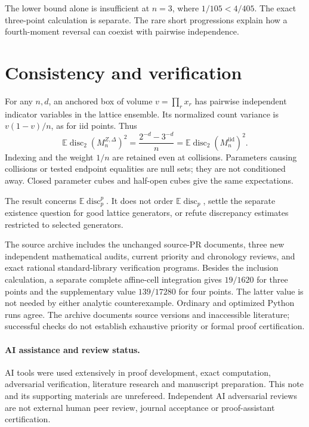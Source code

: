 \documentclass[11pt]{article}
\newcommand{\E}{\mathbb E}
\newcommand{\disc}{\operatorname{disc}}
\newcommand{\iid}{\mathrm{iid}}
\begin{document}
The lower bound alone is insufficient at $n=3$, where
$1/105<4/405$. The exact three-point calculation is separate.
The rare short progressions explain how a fourth-moment reversal can
coexist with pairwise independence.

\section{Consistency and verification}
For any $n,d$, an anchored box of volume $v=\prod_r x_r$ has pairwise
independent indicator variables in the lattice ensemble. Its normalized
count variance is $v(1-v)/n$, as for iid points. Thus
\[
 \E\disc_2(M_n^{Z,\Delta})^2
 =\frac{2^{-d}-3^{-d}}{n}
 =\E\disc_2(M_n^\iid)^2.
\]
Indexing and the weight $1/n$ are retained even at collisions. Parameters
causing collisions or tested endpoint equalities are null sets; they
are not conditioned away. Closed parameter cubes and half-open cubes
give the same expectations.

The result concerns $\E\disc_p^p$. It does not order $\E\disc_p$,
settle the separate existence question for good lattice generators,
or refute discrepancy estimates restricted to selected generators.

The source archive includes the unchanged source-PR documents, three new
independent mathematical audits, current priority and chronology reviews,
and exact rational standard-library verification programs. Besides the
inclusion calculation, a separate complete affine-cell integration gives
$19/1620$ for three points and the supplementary value $139/17280$
for four points. The latter value is not needed by either analytic
counterexample. Ordinary and optimized Python runs agree. The archive
documents source versions and inaccessible literature; successful checks
do not establish exhaustive priority or formal proof certification.

\paragraph{AI assistance and review status.}
AI tools were used extensively in proof development, exact computation,
adversarial verification, literature research and manuscript preparation.
This note and its supporting materials are unrefereed. Independent AI
adversarial reviews are not external human peer review, journal acceptance
or proof-assistant certification.
\end{document}
